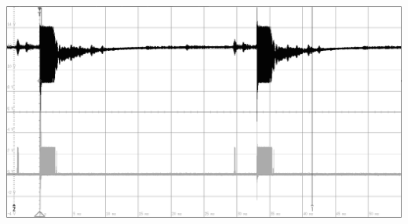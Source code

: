 \begin{minipage}{0.46\textwidth}
\includegraphics[width=1\textwidth%
]{Abbildungen/MessungenP2/20V/5m.PNG}
\end{minipage}\\


